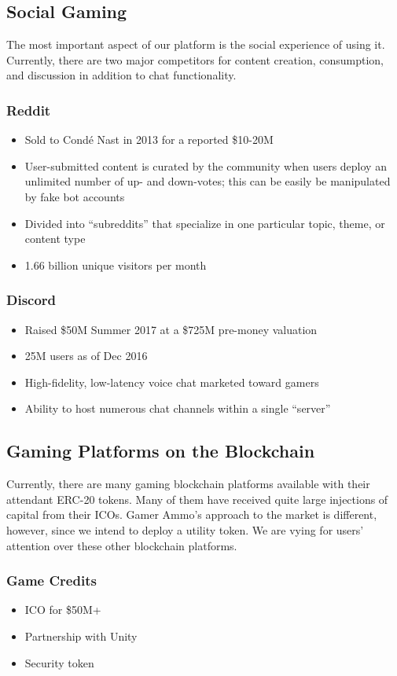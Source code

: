 \documentclass[11pt]{report}
\begin{document}
\subsection{Social Gaming}
The most important aspect of our platform is the social experience of using it. Currently, there are two major competitors for content creation, consumption, and discussion in addition to chat functionality.
\subsubsection{Reddit\cite{reddit}}
\begin{itemize}
\item Sold to Condé Nast in 2013 for a reported \$10-20M
\item User-submitted content is curated by the community when users deploy an unlimited number of up- and down-votes; this can be easily be manipulated by fake bot accounts
\item
Divided into ``subreddits'' that specialize in one particular topic, theme, or content type
\item 1.66 billion unique visitors per month
\end{itemize}
\subsubsection{Discord\cite{discord}}
\begin{itemize}
\item Raised \$50M Summer 2017 at a \$725M pre-money valuation
\item 25M users as of Dec 2016
\item High-fidelity, low-latency voice chat marketed toward gamers
\item Ability to host numerous chat channels within a single ``server''
\end{itemize}
\subsection{Gaming Platforms on the Blockchain}
Currently, there are many gaming blockchain platforms available with their attendant ERC-20 tokens. Many of them have received quite large injections of capital from their ICOs. Gamer Ammo's approach to the market is different, however, since we intend to deploy a utility token. We are vying for users' attention over these other blockchain platforms.
\subsubsection{Game Credits\cite{gamecredits}}
\begin{itemize}
\item ICO for \$50M+
\item Partnership with Unity
\item Security token
\end{itemize}
\end{document}
